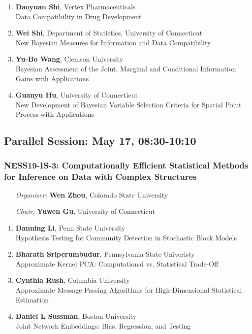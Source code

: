 \begin{enumerate}
\item \textbf{Daoyuan Shi}, Vertex Pharmaceuticals \\
Data Compatibility in Drug Development
\item \textbf{Wei Shi}, Department of Statistics, University of Connecticut \\
New Bayesian Measures for Information and Data Compatibility
\item \textbf{Yu-Bo Wang}, Clemson University \\
Bayesian Assessment of the Joint, Marginal and Conditional Information Gains with Applications
\item \textbf{Guanyu Hu}, University of Connecticut \\
New Development of Bayesian Variable Selection Criteria for Spatial Point Process with Applications
\end{enumerate}

\subsection*{Parallel Session: May 17, 08:30-10:10}

\subsubsection*{NESS19-IS-3: Computationally Efficient Statistical Methods for Inference on Data with Complex Structures}

\begin{enumerate}[align=left]
\item [\emph{Organizer:}] \textbf{Wen Zhou}, Colorado State University
\item [\emph{Chair:}] \textbf{Yuwen Gu},  University of Connecticut
\end{enumerate}

\begin{enumerate}
\item \textbf{Danning Li}, Penn State University \\
Hypothesis Testing for Community Detection in Stochastic Block Models
\item \textbf{Bharath Sriperumbudur}, Pennsylvania State Univeristy \\
Approximate Kernel PCA: Computational vs. Statistical Trade-Off
\item \textbf{Cynthia Rush}, Columbia University \\
Approximate Message Passing Algorithms for High-Dimensional Statistical Estimation
\item \textbf{Daniel L Sussman}, Boston University \\
Joint Network Embeddings: Bias, Regression, and Testing
\end{enumerate}

